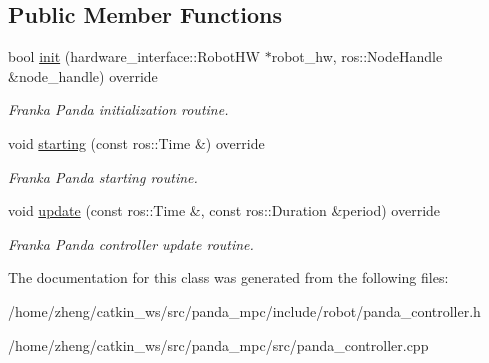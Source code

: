 \subsection*{Public Member Functions}
\begin{DoxyCompactItemize}
\item 
\mbox{\label{classpanda__mpc_1_1_panda_m_p_c_controller_ae8d43af1f86cb114fd2d46b96104e5a0}} 
bool \hyperlink{classpanda__mpc_1_1_panda_m_p_c_controller_ae8d43af1f86cb114fd2d46b96104e5a0}{init} (hardware\+\_\+interface\+::\+Robot\+HW $\ast$robot\+\_\+hw, ros\+::\+Node\+Handle \&node\+\_\+handle) override
\begin{DoxyCompactList}\small\item\em Franka Panda initialization routine. \end{DoxyCompactList}\item 
\mbox{\label{classpanda__mpc_1_1_panda_m_p_c_controller_a70fc2fe27bc42c3b66740b0399feeb5e}} 
void \hyperlink{classpanda__mpc_1_1_panda_m_p_c_controller_a70fc2fe27bc42c3b66740b0399feeb5e}{starting} (const ros\+::\+Time \&) override
\begin{DoxyCompactList}\small\item\em Franka Panda starting routine. \end{DoxyCompactList}\item 
\mbox{\label{classpanda__mpc_1_1_panda_m_p_c_controller_a17e37eded424f2e5460dae0d5a5eea02}} 
void \hyperlink{classpanda__mpc_1_1_panda_m_p_c_controller_a17e37eded424f2e5460dae0d5a5eea02}{update} (const ros\+::\+Time \&, const ros\+::\+Duration \&period) override
\begin{DoxyCompactList}\small\item\em Franka Panda controller update routine. \end{DoxyCompactList}\end{DoxyCompactItemize}


The documentation for this class was generated from the following files\+:\begin{DoxyCompactItemize}
\item 
/home/zheng/catkin\+\_\+ws/src/panda\+\_\+mpc/include/robot/panda\+\_\+controller.\+h\item 
/home/zheng/catkin\+\_\+ws/src/panda\+\_\+mpc/src/panda\+\_\+controller.\+cpp\end{DoxyCompactItemize}
